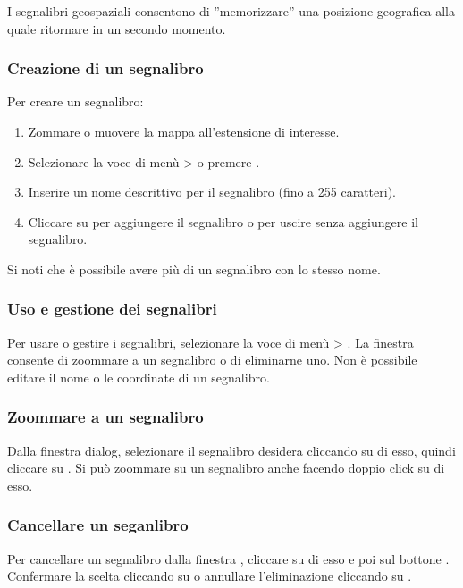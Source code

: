 I segnalibri geospaziali consentono di ''memorizzare'' una posizione
geografica alla quale ritornare in un secondo momento.

\subsubsection{Creazione di un segnalibro}
Per creare un segnalibro:
\begin{enumerate}
\item Zommare o muovere la mappa all'estensione di interesse.
\item Selezionare la voce di menù  >
 o premere .
\item Inserire un nome descrittivo per il segnalibro (fino a 255 caratteri).
\item Cliccare su  per aggiungere il segnalibro o 
per uscire senza aggiungere il segnalibro.
\end{enumerate}

Si noti che è possibile avere più di un segnalibro con lo stesso nome.

\subsubsection{Uso e gestione dei segnalibri}
Per usare o gestire i segnalibri, selezionare la voce di menù
 > .
La finestra  consente di zoommare a un
segnalibro o di eliminarne uno.
Non è possibile editare il nome o le coordinate di un segnalibro.
\subsubsection{Zoommare a un segnalibro}
Dalla finestra  dialog, selezionare il
segnalibro desidera cliccando su di esso, quindi cliccare su .
Si può zoommare su un segnalibro anche facendo doppio click su di esso.

\subsubsection{Cancellare un seganlibro}
Per cancellare un segnalibro dalla finestra ,
cliccare su di esso e poi sul bottone .
Confermare la scelta cliccando su  o annullare l'eliminazione
cliccando su .
